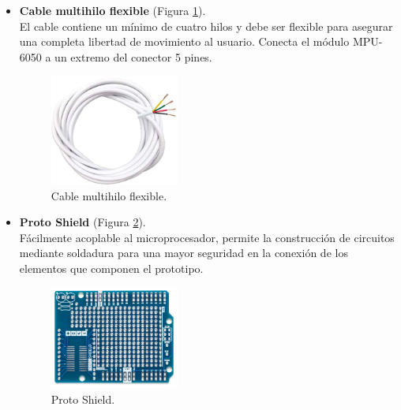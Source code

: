 \begin{itemize}
    \item \textbf{Cable multihilo flexible} (Figura \ref{fig:cableMultihilo}).\\
    El cable contiene un mínimo de cuatro hilos y debe ser flexible para asegurar una completa libertad de movimiento al usuario. Conecta el módulo MPU-6050 a un extremo del conector 5 pines.

    \begin{figure}[h]
        \centering
        \includegraphics[width=0.4\textwidth]{img/4.TecnicasHerramientas/CableMultihilo.png}
        \caption{Cable multihilo flexible. \cite{Cable41:online}}
        \label{fig:cableMultihilo}
    \end{figure}
    
    \item \textbf{Proto Shield} (Figura \ref{fig:shield}).\\
    Fácilmente acoplable al microprocesador, permite la construcción de circuitos mediante soldadura para una mayor seguridad en la conexión de los elementos que componen el prototipo.

    \begin{figure}[h]
        \centering
        \includegraphics[width=0.4\textwidth]{img/4.TecnicasHerramientas/Protoshield.png}
        \caption{Proto Shield. \cite{ProtoShi18:online}}
        \label{fig:shield}
    \end{figure}
    
    
\end{itemize}




